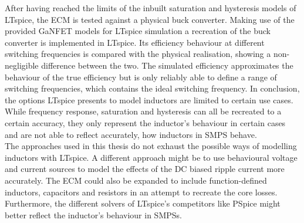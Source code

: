 After having reached the limits of the inbuilt saturation and hysteresis models of LTspice, the \ac{ECM} is tested against a physical buck converter. Making use of the provided \ac{GaNFET} models for LTspice simulation a recreation of the buck converter is implemented in LTspice. Its efficiency behaviour at different switching frequencies is compared with the physical realisation, showing a non-negligible difference between the two. The simulated efficiency approximates the behaviour of the true efficiency but is only reliably able to define a range of switching frequencies, which contains the ideal switching frequency. In conclusion, the options LTspice presents to model inductors are limited to certain use cases. While frequency response, saturation and hysteresis can all be recreated to a certain accuracy, they only represent the inductor's behaviour in certain cases and are not able to reflect accurately, how inductors in \ac{SMPS} behave.\\

The approaches used in this thesis do not exhaust the possible ways of modelling inductors with LTspice. A different approach might be to use behavioural voltage and current sources to model the effects of the \ac{DC} biased ripple current more accurately. The \ac{ECM} could also be expanded to include function-defined inductors, capacitors and resistors in an attempt to recreate the core losses. Furthermore, the different solvers of LTspice's competitors like PSpice might better reflect the inductor's behaviour in \acp{SMPS}.





